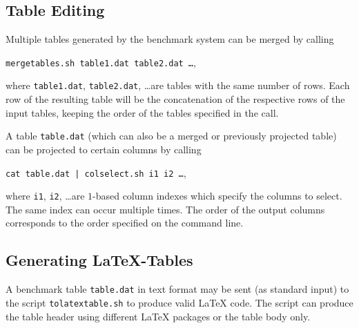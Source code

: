 \documentclass[a4paper]{article}
\begin{document}
		\subsection{Table Editing}

			Multiple tables generated by the benchmark system can be merged by calling
			\begin{center}
				{\tt mergetables.sh table1.dat table2.dat \ldots},
			\end{center}
			where {\tt table1.dat}, {\tt table2.dat}, \ldots are tables
			with the same number of rows. Each row of the resulting table will be the
			concatenation of the respective rows of the input tables, keeping the order of the tables
			specified in the call.

			A table {\tt table.dat} (which can also be a merged or previously projected table) can be projected
			to certain columns by calling
			\begin{center}
				{\tt cat table.dat | colselect.sh i1 i2 \ldots},
			\end{center}
			where {\tt i1}, {\tt i2}, \ldots are $1$-based column indexes
			which specify the columns to select. The same index can occur multiple times.
			The order of the output columns corresponds to the order specified on the command line.

		\subsection{Generating \LaTeX-Tables}

			A benchmark table {\tt table.dat} in text format
			may be sent (as standard input) to the script {\tt tolatextable.sh} to produce valid \LaTeX{} code.
			The script can produce the table header using different \LaTeX{} packages or the table body only.
\end{document}
